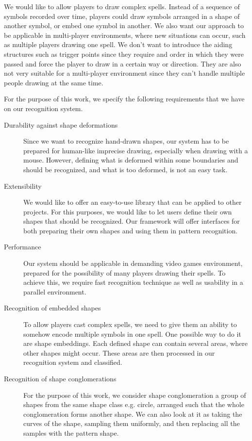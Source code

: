 \begin{description}
We would like to allow players to draw complex spells. Instead of a sequence of symbols recorded over time, players could draw symbols arranged in a shape of another symbol, or embed one symbol in another. We also want our approach to be applicable in multi-player environments, where new situations can occur, such as multiple players drawing one spell. We don't want to introduce the aiding structures such as trigger points since they require and order in which they were passed and force the player to draw in a certain way or direction. They are also not very suitable for a multi-player environment since they can't handle multiple people drawing at the same time.

For the purpose of this work, we specify the following requirements that we have on our recognition system.
\begin{description}

\item [Durability against shape deformations]
Since we want to recognize hand-drawn shapes, our system has to be prepared for human-like imprecise drawing, especially when drawing with a mouse. However, defining what is deformed within some boundaries and should be recognized, and what is too deformed, is not an easy task.

\item [Extensibility]
We would like to offer an easy-to-use library that can be applied to other projects. For this purposes, we would like to let users define their own shapes that should be recognized. Our framework will offer interfaces for both preparing their own shapes and using them in pattern recognition.

\item [Performance]
Our system should be applicable in demanding video games environment, prepared for the possibility of many players drawing their spells. To achieve this, we require fast recognition technique as well as usability in a parallel environment. 

\item [Recognition of embedded shapes]
To allow players cast complex spells, we need to give them an ability to somehow encode multiple symbols in one spell. One possible way to do it are shape embeddings. Each defined shape can contain several areas, where other shapes might occur. These areas are then processed in our recognition system and classified.

\item [Recognition of shape conglomerations]
For the purpose of this work, we consider shape conglomeration a group of shapes from the same shape class e.g. circle, arranged such that the whole conglomeration forms another shape. We can also look at it as taking the curves of the shape, sampling them uniformly, and then replacing all the samples with the pattern shape.


\end{description}
\end{description}
